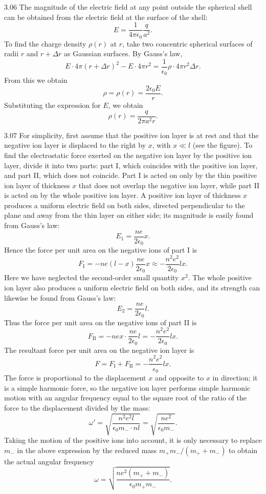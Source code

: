 \begin{solution}{3.06}
The magnitude of the electric field at any point outside the spherical shell can be obtained from the electric field at the surface of the shell:
\[
E=\frac{1}{4\pi\epsilon_0}\frac{q}{a^2}.
\]
To find the charge density $\rho(r)$ at $r$, take two concentric spherical surfaces of radii $r$ and $r+\Delta r$ as Gaussian surfaces. By Gauss's law,
\[
E\cdot 4\pi(r+\Delta r)^2-E\cdot 4\pi r^2=\frac{1}{\epsilon_0}\rho\cdot 4\pi r^2\Delta r.
\]
From this we obtain
\[
\rho=\rho(r)=\frac{2\epsilon_0E}{r}.
\]
Substituting the expression for $E$, we obtain
\[
\rho(r)=\frac{q}{2\pi a^2r}.
\]
\end{solution}

\begin{solution}{3.07}
For simplicity, first assume that the positive ion layer is at rest and that the negative ion layer is displaced to the right by $x$, with $x\ll l$ (see the figure). To find the electrostatic force exerted on the negative ion layer by the positive ion layer, divide it into two parts: part I, which coincides with the positive ion layer, and part II, which does not coincide. Part I is acted on only by the thin positive ion layer of thickness $x$ that does not overlap the negative ion layer, while part II is acted on by the whole positive ion layer. A positive ion layer of thickness $x$ produces a uniform electric field on both sides, directed perpendicular to the plane and away from the thin layer on either side; its magnitude is easily found from Gauss's law:
\[
E_1=\frac{ne}{2\epsilon_0}x.
\]
Hence the force per unit area on the negative ions of part I is
\[
F_{\mathrm{I}}=-ne(l-x)\frac{ne}{2\epsilon_0}x\approx-\frac{n^2e^2}{2\epsilon_0}lx.
\]
Here we have neglected the second-order small quantity $x^2$. The whole positive ion layer also produces a uniform electric field on both sides, and its strength can likewise be found from Gauss's law:
\[
E_2=\frac{ne}{2\epsilon_0}l.
\]
Thus the force per unit area on the negative ions of part II is
\[
F_{\mathrm{II}}=-nex\cdot\frac{ne}{2\epsilon_0}l=-\frac{n^2e^2}{2\epsilon_0}lx.
\]
The resultant force per unit area on the negative ion layer is
\[
F=F_{\mathrm{I}}+F_{\mathrm{II}}=-\frac{n^2e^2}{\epsilon_0}lx.
\]
The force is proportional to the displacement $x$ and opposite to $x$ in direction; it is a simple harmonic force, so the negative ion layer performs simple harmonic motion with an angular frequency equal to the square root of the ratio of the force to the displacement divided by the mass:
\[
\omega'=\sqrt{\frac{n^2e^2l}{\epsilon_0m_-\cdot nl}}
=\sqrt{\frac{ne^2}{\epsilon_0m_-}}.
\]
Taking the motion of the positive ions into account, it is only necessary to replace $m_-$ in the above expression by the reduced mass $m_+m_-/(m_++m_-)$ to obtain the actual angular frequency
\[
\omega=\sqrt{\frac{ne^2(m_++m_-)}{\epsilon_0m_+m_-}}.
\]


\end{solution}

